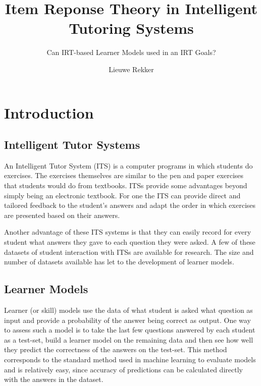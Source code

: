 \documentclass{scrartcl}
\begin{document}
 
\title{Item Reponse Theory in Intelligent Tutoring Systems}
\subtitle{Can IRT-based Learner Models used in an IRT Goals?}

\author{Lieuwe Rekker}
\maketitle
\nocite{labelcombi}
\nocite{lftransfer}
\nocite{importance}
\nocite{knowledgeproblem}
\nocite{modelreview}
\nocite{eirt}
\nocite{pfa}
\nocite{ktpfa}
\nocite{skillcombi}
\nocite{lfa}
\nocite{blackart}
\nocite{hambleton}
\nocite{bridge}
\nocite{ct}
\nocite{algebra}
\nocite{assessment}


\section{Introduction}


\subsection{Intelligent Tutor Systems}
An Intelligent Tutor System (ITS) is a computer programs in which students do exercises. The exercises themselves are similar to the pen and paper exercises that students would do from textbooks. ITSs provide some advantages beyond simply being an electronic textbook. For one the ITS can provide direct and tailored feedback to the student's answers and adapt the order in which exercises are presented based on their answers. 

Another advantage of these ITS systems is that they can easily record for every student what answers they gave to each question they were asked. A few of these datasets of student interaction with ITSs are available for research. The size and number of datasets available has let to the development of learner models.

\subsection{Learner Models}
Learner (or skill) models use the data of what student is asked what question as input and provide a probability of the answer being correct as output. One way to assess such a model is to take the last few questions answered by each student as a test-set, build a learner model on the remaining data and then see how well they predict the correctness of the answers on the test-set. This method corresponds to the standard method used in machine learning to evaluate models and is relatively easy, since accuracy of predictions can be calculated directly with the answers in the dataset.
\end{document}

